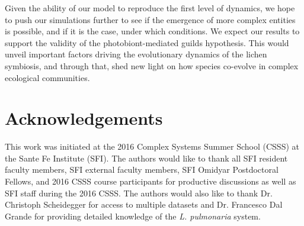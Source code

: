 \documentclass[runningheads,a4paper]{llncs}
\begin{document}
Given the ability of our model to reproduce the first level of dynamics, we hope to push our simulations further to see if the emergence of more complex entities is possible, and if it is the case, under which conditions. We expect our results to support the validity of the photobiont-mediated guilds hypothesis. This would unveil important factors driving the evolutionary dynamics of the lichen symbiosis, and through that, shed new light on how species co-evolve in complex ecological communities.

\section*{Acknowledgements}
This work was initiated at the 2016 Complex Systems Summer School (CSSS) at the Sante Fe Institute (SFI). The authors would like to thank all SFI resident faculty members, SFI external faculty members, SFI Omidyar Postdoctoral Fellows, and 2016 CSSS course participants for productive discussions as well as SFI staff during the 2016 CSSS. The authors would also like to thank Dr. Christoph Scheidegger for access to multiple datasets and Dr. Francesco Dal Grande for providing detailed knowledge of the \emph{L. pulmonaria} system. 



\end{document}
